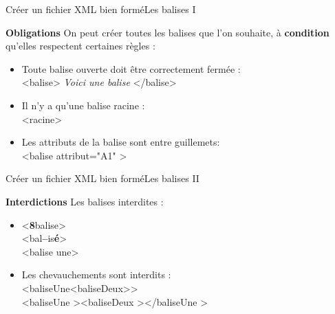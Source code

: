 \documentclass{beamer}
\begin{document}
\begin{frame}{Créer un fichier XML bien formé}{Les balises I}
\begin{block}{\textbf{Obligations}}
On peut créer toutes les balises que l'on souhaite, à \textbf{condition} qu'elles respectent certaines règles :\\
    \begin{itemize}
        \item{
        Toute balise ouverte doit être correctement fermée : \\
            \textless balise\textgreater \textit{ Voici une balise} \textless/balise\textgreater
        }\pause
        \item{
        Il n'y a qu'une balise racine : \\
            \textless racine\textgreater
        }\pause
        \item{
        Les attributs de la balise sont entre guillemets:\\
            \textless balise attribut="A1" \textgreater
        }
    \end{itemize}
\end{block}
\end{frame}

\begin{frame}{Créer un fichier XML bien formé}{Les balises II}
\begin{block}{\textbf{Interdictions}}
Les balises interdites : \\
    \begin{itemize}
        \item{
            \textless \textbf{8}balise\textgreater \\
            \textless bal\textbf{--}is\textbf{é}\textgreater \\
            \textless balise une\textgreater
        }\pause
        \item{
        Les chevauchements sont interdits : \\
        \textless baliseUne\textless baliseDeux\textgreater\textgreater\\
        \textless baliseUne \textgreater  \textless baliseDeux \textgreater  \textless /baliseUne \textgreater 
        }
    \end{itemize}
\end{block}
\end{frame}
\end{document}
